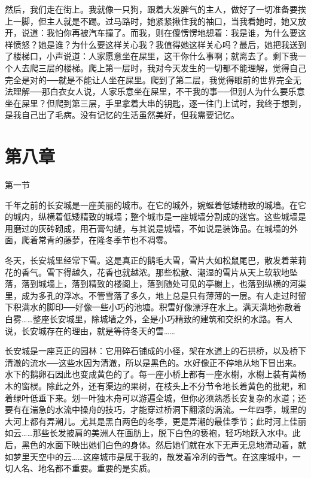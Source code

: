然后，我们走在街上。我就像一只狗，跟着大发脾气的主人，做好了一切准备要挨上一脚，但主人就是不踢。过马路时，她紧紧揪住我的袖口，当我看她时，她又放开，说道：我怕你再被汽车撞了。而我，则在傻愣愣地想着：我是谁，为什么要这样愤怒？她是谁？为什么要这样关心我？我值得她这样关心吗？最后，她把我送到了楼梯口，小声说道：人家愿意坐在屎里，这干你什么事啊；就离去了。剩下我一个人去爬三层的楼梯。爬上第一层时，我对今天发生的一切都不能理解，觉得自己完全是对的──就是不能让人坐在屎里。爬到了第二层，我觉得眼前的世界完全无法理解──那白衣女人说，人家乐意坐在屎里，不干我的事──但别人为什么要乐意坐在屎里？但爬到第三层，手里拿着大串的钥匙，逐一往门上试时，我终于想到，是我自己出了毛病。没有记忆的生活虽然美好，但我需要记忆。

\section{第八章}

第一节 

千年之前的长安城是一座美丽的城市。在它的城外，婉蜒着低矮精致的城墙。在它的城内，纵横着低矮精致的城墙；整个城市是一座城墙分割成的迷宫。这些城墙是用磨过的灰砖砌成，用石膏勾缝，与其说是城墙，不如说是装饰品。在城墙的外面，爬着常青的藤萝，在隆冬季节也不凋零。 

冬天，长安城里经常下雪。这是真正的鹅毛大雪，雪片大如松鼠尾巴，散发着茉莉花的香气。雪下得越久，花香也就越浓。那些松散、潮湿的雪片从天上软软地坠落，落到城墙上，落到精致的楼阁上，落到随处可见的亭榭上，也落到纵横的河渠里，成为多孔的浮冰。不管雪落了多久，地上总是只有薄薄的一层。有人走过时留下积满水的脚印──好像一些小巧的池塘。积雪好像漂浮在水上。满天满地弥散着白雾……整座长安城里，除城墙之外，全是小巧精致的建筑和交织的水路。有人说，长安城存在的理由，就是等待冬天的雪…… 

长安城是一座真正的园林：它用碎石铺成的小径，架在水道上的石拱桥，以及桥下清澈的流水──这些水因为清澈，所以是黑色的。水好像正不停地从地下冒出来。水下的鹅卵石因此也变成黄色的了。每一座小桥上都有一座水榭，水榭上装有黄杨木的窗棂。除此之外，还有渠边的果树，在枝头上不分节令地长着黄色的批耙，和着绿叶低垂下来。划一叶独木舟可以游遍全城，但你必须熟悉长安复杂的水道；还要有在湍急的水流中操舟的技巧，才能穿过桥洞下翻滚的涡流。一年四季，城里的大河上都有弄潮儿。尤其是黑白两色的冬季，更是弄潮的最佳季节；此时河上佳丽如云……那些长发披肩的美洲人在画肪上，脱下白色的亵袍，轻巧地跃入水中。此后，黑色的水面下映出她们白色的身体。然后她们就在水下无声无息地滑动着，就如梦里天空中的云……这座城市是属于我的，散发着冷冽的香气。在这座城中，一切人名、地名都不重要。重要的是实质。 

